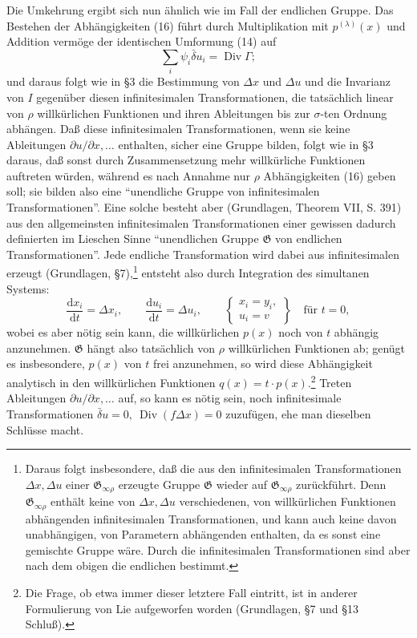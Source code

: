 \documentclass[11pt]{article}
\newcommand{\dd}{\mathrm d}
\newcommand{\Div}{\operatorname{Div}}
\newcommand{\G}{\mathfrak G}
\newcommand{\D}{\Delta}
\newcommand{\bd}{\bar{\delta}}
\newcommand{\p}{\partial}
\begin{document}
Die Umkehrung ergibt sich nun ähnlich wie im Fall der endlichen Gruppe. Das Bestehen der Abhängigkeiten (16) führt durch Multiplikation mit \(p^{(\lambda)}(x)\) und Addition vermöge der identischen Umformung (14) auf
\[
\sum_i\psi_i\bd u_i=\Div\Gamma;
\]
und daraus folgt wie in \S{}3 die Bestimmung von \(\D x\) und \(\D u\) und die Invarianz von \(I\) gegenüber diesen infinitesimalen Transformationen, die tatsächlich linear von \(\rho\) willkürlichen Funktionen und ihren Ableitungen bis zur \(\sigma\)-ten Ordnung abhängen. Daß diese infinitesimalen Transformationen, wenn sie keine Ableitungen \(\p u/\p x,\ldots\) enthalten, sicher eine Gruppe bilden, folgt wie in \S{}3 daraus, daß sonst durch Zusammensetzung mehr willkürliche Funktionen auftreten würden, während es nach Annahme nur \(\rho\) Abhängigkeiten (16) geben soll; sie bilden also eine ``unendliche Gruppe von infinitesimalen Transformationen''. Eine solche besteht aber (Grundlagen, Theorem VII, S. 391) aus den allgemeinsten infinitesimalen Transformationen einer gewissen dadurch definierten im Lieschen Sinne ``unendlichen Gruppe \(\G\) von endlichen Transformationen''. Jede endliche Transformation wird dabei aus infinitesimalen erzeugt (Grundlagen, \S{}7),\footnote{Daraus folgt insbesondere, daß die aus den infinitesimalen Transformationen \(\D x,\D u\) einer \(\G_{\infty\rho}\) erzeugte Gruppe \(\G\) wieder auf \(\G_{\infty\rho}\) zurückführt. Denn \(\G_{\infty\rho}\) enthält keine von \(\D x,\D u\) verschiedenen, von willkürlichen Funktionen abhängenden infinitesimalen Transformationen, und kann auch keine davon unabhängigen, von Parametern abhängenden enthalten, da es sonst eine gemischte Gruppe wäre. Durch die infinitesimalen Transformationen sind aber nach dem obigen die endlichen bestimmt.} entsteht also durch Integration des simultanen Systems:
\[
\frac{\dd x_i}{\dd t}=\D x_i,\qquad
\frac{\dd u_i}{\dd t}=\D u_i,\qquad
\left\{\begin{array}{l}
x_i=y_i,\\
u_i=v
\end{array}\right\}
\quad\text{für }t=0,
\]
wobei es aber nötig sein kann, die willkürlichen \(p(x)\) noch von \(t\) abhängig anzunehmen. \(\G\) hängt also tatsächlich von \(\rho\) willkürlichen Funktionen ab; genügt es insbesondere, \(p(x)\) von \(t\) frei anzunehmen, so wird diese Abhängigkeit analytisch in den willkürlichen Funktionen \(q(x)=t\cdot p(x)\).\footnote{Die Frage, ob etwa immer dieser letztere Fall eintritt, ist in anderer Formulierung von Lie aufgeworfen worden (Grundlagen, \S{}7 und \S{}13 Schluß).} Treten Ableitungen \(\p u/\p x,\ldots\) auf, so kann es nötig sein, noch infinitesimale Transformationen \(\bd u=0,\ \Div(f\D x)=0\) zuzufügen, ehe man dieselben Schlüsse macht.
\end{document}
